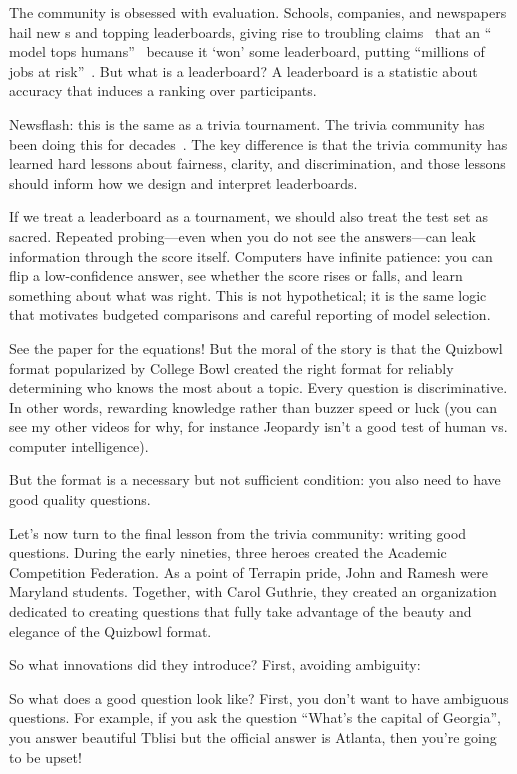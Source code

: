 The \qa{} community is obsessed with evaluation.
Schools, companies, and newspapers hail new s and topping
leaderboards, giving rise to troubling claims~\citep{lipton-19} that an
`` model tops humans''~\citep{najberg-18} because it `won'
some leaderboard, putting ``millions of jobs at
risk''~\citep{cuthbertson-18}.
But what is a leaderboard?
A leaderboard is a statistic about \qa{} accuracy that induces a ranking over participants.

Newsflash: this is the same as a trivia tournament.
The trivia community has been doing this for decades~\citep{jennings-06}.
The key difference is that the trivia community has learned hard lessons about
fairness, clarity, and discrimination, and those lessons should inform how we
design and interpret \qa{} leaderboards.

If we treat a leaderboard as a tournament, we should also treat the test set
as sacred. Repeated probing---even when you do not see the answers---can leak
information through the score itself. Computers have infinite patience: you
can flip a low-confidence answer, see whether the score rises or falls, and
learn something about what was right. This is not hypothetical; it is the same
logic that motivates budgeted comparisons and careful reporting of model
selection.


See the paper for the equations!  But the moral of the story is that the Quizbowl format popularized by College Bowl created the right format for reliably determining who knows the most about a topic.  Every question is discriminative.  In other words, rewarding knowledge rather than buzzer speed or luck (you can see my other videos for why, for instance Jeopardy isn’t a good test of human vs. computer intelligence).

But the format is a necessary but not sufficient condition: you also need to have good quality questions.  

Let’s now turn to the final lesson from the trivia community: writing good questions.  During the early nineties, three heroes created the Academic Competition Federation.  As a point of Terrapin pride, John and Ramesh were Maryland students.  Together, with Carol Guthrie, they created an organization dedicated to creating questions that fully take advantage of the beauty and elegance of the Quizbowl format.

So what innovations did they introduce?  First, avoiding ambiguity: 

So what does a good question look like?  First, you don’t want to have ambiguous questions.  For example, if you ask the question “What’s the capital of Georgia”, you answer beautiful Tblisi but the official answer is Atlanta, then you’re going to be upset! 

